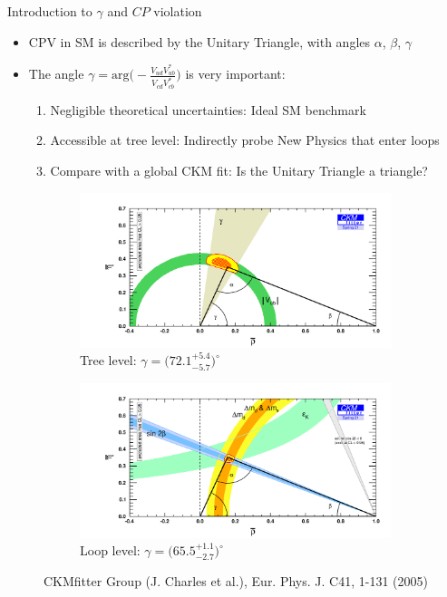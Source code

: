 \documentclass{beamer}
\begin{document}
\begin{frame}{Introduction to $\gamma$ and $C\!P$ violation}
  \begin{itemize}
    \setlength\itemsep{0.3em}
    \item{CPV in SM is described by the Unitary Triangle, with angles $\alpha$, $\beta$, $\gamma$}
    \item{The angle $\gamma = \text{arg}\Big(-\frac{V^{\phantom{*}}_{ud}V^*_{ub}}{V^{\phantom{*}}_{cd}V^*_{cb}}\Big)$ is very important:}
    \begin{enumerate}
    \setlength\itemsep{0.2em}
      \item{Negligible theoretical uncertainties: Ideal SM benchmark}
      \item{Accessible at tree level: Indirectly probe New Physics that enter loops}
      \item{Compare with a global CKM fit: Is the Unitary Triangle a triangle?}
    \end{enumerate}
  \end{itemize}
  \vspace{-0.2cm}
  \begin{figure}
    \centering
    \begin{subfigure}{0.5\textwidth}
      \centering
      \includegraphics[width = 1.0\textwidth]{Plots/ckmfitter_tree.png}
      \caption{Tree level: $\gamma = \big(72.1^{+5.4}_{-5.7}\big)^\circ$}
    \end{subfigure}%
    \begin{subfigure}{0.5\textwidth}
      \centering
      \includegraphics[width = 1.0\textwidth]{Plots/ckmfitter_loop.png}
      \caption{Loop level: $\gamma = \big(65.5^{+1.1}_{-2.7}\big)^\circ$}
    \end{subfigure}
    \vspace{-0.3cm}
    \caption*{\tiny CKMfitter Group (J. Charles et al.), Eur. Phys. J. C41, 1-131 (2005)}
  \end{figure}
\end{frame}
\end{document}

